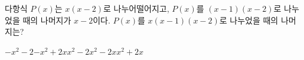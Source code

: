 다항식 $P(x)$는 $x(x-2)$로 나누어떨어지고, $P(x)$를 $(x-1)(x-2)$로 나누었을 때의 나머지가 $x-2$이다. $P(x)$를 $x(x-1)(x-2)$로 나누었을 때의 나머지는?
\begin{choices32}{$-x^2-2$}{$-x^2+2x$}{$x^2-2$}{$x^2-2x$}{$x^2+2x$}\end{choices32}
